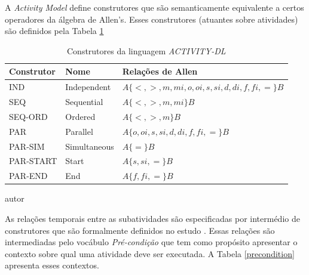 A \textit{Activity Model} define construtores que são semanticamente equivalente a certos operadores da álgebra de Allen's. Esses construtores (atuantes sobre atividades) são definidos pela Tabela \ref{acticonstruct}

\begin{table}[H]
\centering
\caption{Construtores da linguagem \textit{ACTIVITY-DL} \cite{v3sframework}}
\begin{tabular}{|l|l|l|}
\hline
Construtor & Nome         & Relações de Allen \\ \hline
IND        & Independent  & $A \{ <,>,m,mi,o,oi,s,si,d,di,f,fi,= \} B$\\ \hline
SEQ        & Sequential   & $A \{ <,>,m,mi \} B$\\ \hline
SEQ-ORD    & Ordered      & $A \{ <,>,m \} B$\\ \hline
PAR        & Parallel     & $A \{ o,oi,s,si,d,di,f,fi,= \} B$ \\ \hline
PAR-SIM    & Simultaneous & $A \{ = \} B$\\ \hline
PAR-START  & Start        & $A \{ s,si,= \} B$\\ \hline
PAR-END    & End          & $A \{ f,fi,= \} B$ \\ \hline
\end{tabular}
\begin{center}
autor
\end{center}
\label{acticonstruct}
\end{table}

As relações temporais entre as subatividades são especificadas por intermédio de construtores que são formalmente definidos no estudo \cite{allenalgebric}. Essas relações são intermediadas pelo vocábulo \textit{Pré-condição} que tem como propósito apresentar o contexto sobre qual uma atividade deve ser executada. A Tabela \ref{precondition} apresenta esses contextos.

